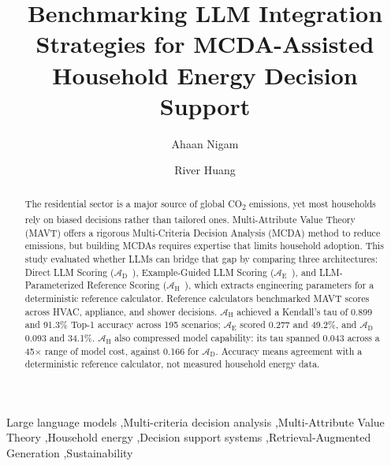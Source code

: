\documentclass[a4paper,fleqn]{cas-dc}
\begin{document}
\title[mode=title]{Benchmarking LLM Integration Strategies for MCDA-Assisted Household Energy Decision Support}

\author[1]{Ahaan Nigam}
\cormark[1]

\author[2]{River Huang}


\begin{abstract}
The residential sector is a major source of global CO\textsubscript{2} emissions, yet most households rely on biased decisions rather than tailored ones. Multi-Attribute Value Theory (MAVT) offers a rigorous Multi-Criteria Decision Analysis (MCDA) method to reduce emissions, but building MCDAs requires expertise that limits household adoption. This study evaluated whether LLMs can bridge that gap by comparing three architectures: Direct LLM Scoring ($\mathcal{A}_{\text{D}}$~), Example-Guided LLM Scoring ($\mathcal{A}_{\text{E}}$~), and LLM-Parameterized Reference Scoring ($\mathcal{A}_{\text{H}}$~), which extracts engineering parameters for a deterministic reference calculator. Reference calculators benchmarked MAVT scores across HVAC, appliance, and shower decisions. $\mathcal{A}_{\text{H}}$ achieved a Kendall's tau of 0.899 and 91.3\% Top-1 accuracy across 195 scenarios; $\mathcal{A}_{\text{E}}$ scored 0.277 and 49.2\%, and $\mathcal{A}_{\text{D}}$ 0.093 and 34.1\%. $\mathcal{A}_{\text{H}}$ also compressed model capability: its tau spanned 0.043 across a 45$\times$ range of model cost, against 0.166 for $\mathcal{A}_{\text{D}}$. Accuracy means agreement with a deterministic reference calculator, not measured household energy data.\end{abstract}

\begin{keywords}
Large language models \sep Multi-criteria decision analysis \sep Multi-Attribute Value Theory \sep Household energy \sep Decision support systems \sep Retrieval-Augmented Generation \sep Sustainability
\end{keywords}

\maketitle
\end{document}

